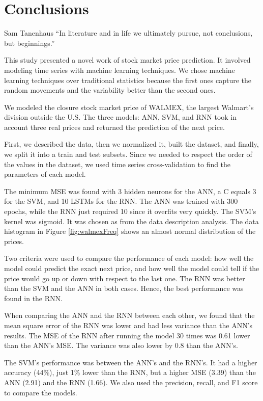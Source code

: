 \chapter{Conclusions}
\label{ch:conclusions}
\begin{chapterquote}{ Sam Tanenhaus}
“In literature and in life we ultimately pursue, not conclusions, but beginnings.”
\end{chapterquote}


This study presented a novel work of stock market price prediction. It involved modeling time series with machine learning techniques. We chose machine learning techniques over traditional statistics because the first ones capture the random movements and the variability better than the second ones. 


We modeled the closure stock market price of WALMEX, the largest Walmart's division outside the U.S. The three models: ANN, SVM, and RNN took in account three real prices and returned the prediction of the next price.

First, we described the data, then we normalized it, built the dataset, and finally, we split it into a train and test subsets. Since we needed to respect the order of the values in the dataset, we used time series cross-validation to find the parameters of each model.

The minimum MSE was found with 3 hidden neurons for the ANN, a C equals 3 for the SVM, and 10 LSTMs for the RNN. The ANN was trained with 300 epochs, while the RNN just required 10 since it overfits very quickly. The SVM's kernel was sigmoid. It was chosen as from the data description analysis. The data histogram in Figure \ref{fig:walmexFreq} shows an almost normal distribution of the prices. 

Two criteria were used to compare the performance of each model: how well the model could predict the exact next price, and how well the model could tell if the price would go up or down with respect to the last one. The RNN was better than the SVM and the ANN in both cases. Hence, the best performance was found in the RNN.

When comparing the ANN and the RNN between each other, we found that the mean square error of the RNN was lower and had less variance than the ANN's results. The MSE of the RNN after running the model 30 times was 0.61 lower than the ANN's MSE. The variance was also lower by 0.8 than the ANN's.

The SVM's performance was between the ANN's and the RNN's. It had a higher accuracy (44\%), just 1\% lower than the RNN, but a higher MSE (3.39) than the ANN (2.91) and the RNN (1.66). We also used the precision, recall, and F1 score to compare the models. 

